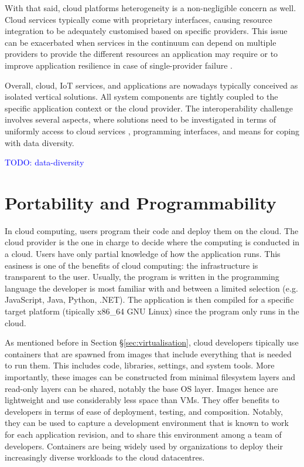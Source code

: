 With that said, cloud platforms heterogeneity is a non-negligible concern as well. Cloud services typically come with proprietary interfaces, causing resource integration to be adequately customised based on specific providers. This issue can be exacerbated when services in the continuum can depend on multiple providers to provide the different resources an application may require or to improve application resilience in case of single-provider failure \cite{inter-cloud}.

Overall, cloud, IoT services, and applications are nowadays typically conceived as isolated vertical solutions. All system components are tightly coupled to the specific application context or the cloud provider. The interoperability challenge involves several aspects, where solutions need to be investigated in terms of uniformly access to cloud services \cite{inter-cloud}, programming interfaces, and means for coping with data diversity.

\textcolor{blue}{TODO: data-diversity}

\section{Portability and Programmability}

In cloud computing, users program their code and deploy them on the cloud. The cloud provider is the one in charge to decide where the computing is conducted in a cloud. Users have only partial knowledge of how the application runs. This easiness is one of the benefits of cloud computing: the infrastructure is transparent to the user. Usually, the program is written in the programming language the developer is most familiar with and between a limited selection (e.g. JavaScript, Java, Python, .NET). The application is then compiled for a specific target platform (tipically x86\_64 GNU Linux) since the program only runs in the cloud.

As mentioned before in Section §\ref{sec:virtualisation}, cloud developers tipically use containers that are spawned from images that include everything that is needed to run them. This includes code, libraries, settings, and system tools. More importantly, these images can be constructed from minimal filesystem layers and read-only layers can be shared, notably the base OS layer. Images hence are lightweight and use considerably less space than VMs. They offer benefits to developers in terms of ease of deployment, testing, and composition. Notably, they can be used to capture a development environment that is known to work for each application revision, and to share this environment among a team of developers. Containers are being widely used by organizations to deploy their increasingly diverse workloads to the cloud datacentres.

